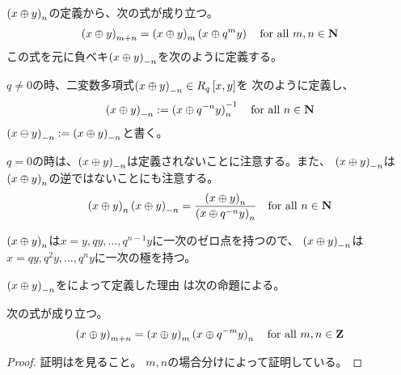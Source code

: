 {	$\mathinner{({x\oplus y})}_n$の定義から、次の式が成り立つ。
	\begin{equation*}\begin{split}
		\mathinner{({x\oplus y})}_{m+n} = \mathinner{({x\oplus y})}_m\mathinner{({x\oplus q^my})}
		\quad\text{for all } m,n\in\mathbf{N}
	\end{split}\end{equation*}
	この式を元に負ベキ$\mathinner{({x\oplus y})}_{-n}$を次のように定義する。

	\begin{definition}\label{def:負ベキのq-アナログ} %
		$q\neq0$の時、二変数多項式$\mathinner{({x\oplus y})}_{-n}\in R_q\mathinner{[{x,y}]}$を
		次のように定義し、
		\begin{equation*}\begin{split}
			\mathinner{({x\oplus y})}_{-n} := \mathinner{({x\oplus q^{-n}y})}_n^{-1}
			\quad\text{for all } n\in\mathbf{N}
		\end{split}\end{equation*}
		$\mathinner{({x\ominus y})}_{-n} := \mathinner{({x\oplus y})}_{-n}$と書く。\EOP
	\end{definition} %

	$q=0$の時は、$\mathinner{({x\oplus y})}_{-n}$は定義されないことに注意する。また、
	$\mathinner{({x\oplus y})}_{-n}$は$\mathinner{({x\oplus y})}_n$の逆ではないことにも注意する。
	\begin{equation*}\begin{split}
		\mathinner{({x\oplus y})}_n\mathinner{({x\oplus y})}_{-n} = 
		\frac{\mathinner{({x\oplus y})}_n}{\mathinner{({x\oplus q^{-n}y})}_n}
		\quad\text{for all } n\in\mathbf{N}
	\end{split}\end{equation*}

	$\mathinner{({x\oplus y})}_n$は$x=y,qy,\dots,q^{n-1}y$に一次のゼロ点を持つので、
	$\mathinner{({x\oplus y})}_{-n}$は$x=qy,q^2y,\dots,q^ny$に一次の極を持つ。

	$\mathinner{({x\oplus y})}_{-n}$を\label{def:負ベキのq-アナログ}によって定義した理由
	は次の命題による。

	\begin{proposition}[ベキの乗法]\label{prop:ベキの乗法} %
		次の式が成り立つ。
		\begin{equation*}\begin{split}
			\mathinner{({x\oplus y})}_{m+n} = \mathinner{({x\oplus y})}_m\mathinner{({x\oplus q^{-m}y})}_n
			\quad\text{for all } m,n\in\mathbf{Z}
		\end{split}\end{equation*}
	\end{proposition} %
	\begin{proof} %
		証明はを見ること。
		$m,n$の場合分けによって証明している。
	\end{proof} %

}
